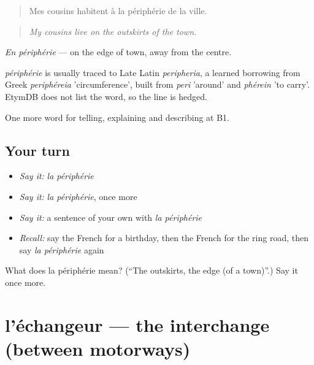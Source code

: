 \begin{quote}
Mes cousins habitent à la périphérie de la ville.
\end{quote}

\begin{quote}
\emph{My cousins live on the outskirts of the town.}
\end{quote}

\emph{En périphérie} — on the edge of town, away from the centre.

\begin{cousinweb}
\emph{périphérie} is usually traced to Late Latin \emph{peripheria}, a learned borrowing from Greek \emph{periphéreia} 'circumference', built from \emph{peri} 'around' and \emph{phérein} 'to carry'. EtymDB does not list the word, so the line is hedged.
\end{cousinweb}

\begin{grammarlens}[title={What you've built}]
One more word for telling, explaining and describing at B1.
\end{grammarlens}

\subsection*{Your turn}
\begin{itemize}
\raggedright
  \item \emph{Say it:} \emph{la périphérie}
  \item \emph{Say it:} \emph{la périphérie}, once more
  \item \emph{Say it:} a sentence of your own with \emph{la périphérie}
  \item \emph{Recall:} say the French for a birthday, then the French for the ring road, then say \emph{la périphérie} again
\end{itemize}

\begin{tcolorbox}[breakable,colback=teal!4,colframe=teal!35!black,title={Before you move on}]
What does la périphérie mean? (\textquotedblleft{}The outskirts, the edge (of a town)\textquotedblright{}.) Say it once more.
\end{tcolorbox}
\section[l'échangeur]{l'échangeur — the interchange (between motorways)}

\label{lesson:FR-C400-echangeur}



